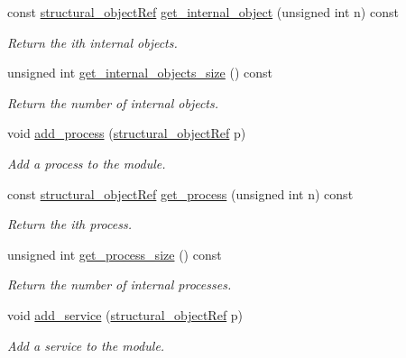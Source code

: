 \begin{DoxyCompactItemize}
\item 
const \hyperlink{structural__objects_8hpp_a8ea5f8cc50ab8f4c31e2751074ff60b2}{structural\+\_\+object\+Ref} \hyperlink{classmodule_af59435e147c07a183bf7c8ab525eb3fd}{get\+\_\+internal\+\_\+object} (unsigned int n) const
\begin{DoxyCompactList}\small\item\em Return the ith internal objects. \end{DoxyCompactList}\item 
unsigned int \hyperlink{classmodule_a4ddb109ccb130b31471a7648dbcf5352}{get\+\_\+internal\+\_\+objects\+\_\+size} () const
\begin{DoxyCompactList}\small\item\em Return the number of internal objects. \end{DoxyCompactList}\item 
void \hyperlink{classmodule_a6130db731833921a393839886b74fcd5}{add\+\_\+process} (\hyperlink{structural__objects_8hpp_a8ea5f8cc50ab8f4c31e2751074ff60b2}{structural\+\_\+object\+Ref} p)
\begin{DoxyCompactList}\small\item\em Add a process to the module. \end{DoxyCompactList}\item 
const \hyperlink{structural__objects_8hpp_a8ea5f8cc50ab8f4c31e2751074ff60b2}{structural\+\_\+object\+Ref} \hyperlink{classmodule_a37459d0c75ef740bb39f8eadc01e107f}{get\+\_\+process} (unsigned int n) const
\begin{DoxyCompactList}\small\item\em Return the ith process. \end{DoxyCompactList}\item 
unsigned int \hyperlink{classmodule_a61d5c6c3c2de87f2fcdb3d8ac9cc5bcf}{get\+\_\+process\+\_\+size} () const
\begin{DoxyCompactList}\small\item\em Return the number of internal processes. \end{DoxyCompactList}\item 
void \hyperlink{classmodule_a7f339a447a770fa3bd9abb9fa81ff888}{add\+\_\+service} (\hyperlink{structural__objects_8hpp_a8ea5f8cc50ab8f4c31e2751074ff60b2}{structural\+\_\+object\+Ref} p)
\begin{DoxyCompactList}\small\item\em Add a service to the module. \end{DoxyCompactList}\item 

\end{DoxyCompactItemize}
